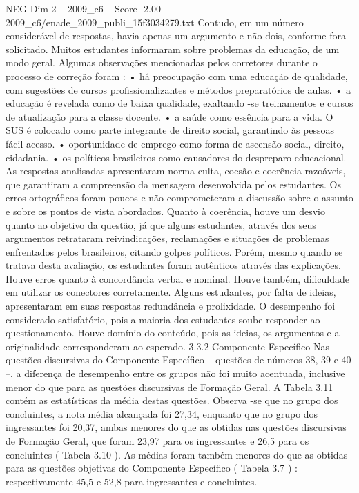 \begin{textsample}{NEG Dim 2 – 2009\_c6 – Score -2.00 – 2009\_c6/enade\_2009\_publi\_15f3034279.txt}
Contudo, em um número considerável de respostas, havia apenas um argumento e não dois, conforme fora solicitado.
Muitos estudantes informaram sobre problemas da educação, de um modo geral.
Algumas observações mencionadas pelos corretores durante o processo de correção foram : • há preocupação com uma educação de qualidade, com sugestões de cursos profissionalizantes e métodos preparatórios de aulas. • a educação é revelada como de baixa qualidade, exaltando -se treinamentos e cursos de atualização para a classe docente. • a saúde como essência para a vida.
O SUS é colocado como parte integrante de direito social, garantindo às pessoas fácil acesso. • oportunidade de emprego como forma de ascensão social, direito, cidadania. • os políticos brasileiros como causadores do despreparo educacional.
As respostas analisadas apresentaram norma culta, coesão e coerência razoáveis, que garantiram a compreensão da mensagem desenvolvida pelos estudantes.
Os erros ortográficos foram poucos e não comprometeram a discussão sobre o assunto e sobre os pontos de vista abordados.
Quanto à coerência, houve um desvio quanto ao objetivo da questão, já que alguns estudantes, através dos seus argumentos retrataram reivindicações, reclamações e situações de problemas enfrentados pelos brasileiros, citando golpes políticos.
Porém, mesmo quando se tratava desta avaliação, os estudantes foram autênticos através das explicações.
Houve erros quanto à concordância verbal e nominal.
Houve também, dificuldade em utilizar os conectores corretamente.
Alguns estudantes, por falta de ideias, apresentaram em suas respostas redundância e prolixidade.
O desempenho foi considerado satisfatório, pois a maioria dos estudantes soube responder ao questionamento.
Houve domínio do conteúdo, pois as ideias, os argumentos e a originalidade corresponderam ao esperado. 3.3.2 Componente Específico Nas questões discursivas do Componente Específico – questões de números 38, 39 e 40 –, a diferença de desempenho entre os grupos não foi muito acentuada, inclusive menor do que para as questões discursivas de Formação Geral.
A Tabela 3.11 contém as estatísticas da média destas questões.
Observa -se que no grupo dos concluintes, a nota média alcançada foi 27,34, enquanto que no grupo dos ingressantes foi 20,37, ambas menores do que as obtidas nas questões discursivas de Formação Geral, que foram 23,97 para os ingressantes e 26,5 para os concluintes ( Tabela 3.10 ).
As médias foram também menores do que as obtidas para as questões objetivas do Componente Específico ( Tabela 3.7 ) : respectivamente 45,5 e 52,8 para ingressantes e concluintes.

\end{textsample}
